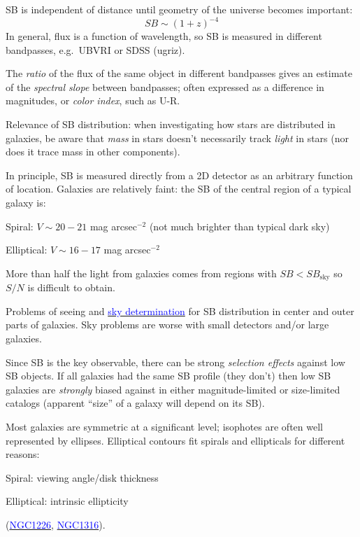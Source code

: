 \documentclass[12pt]{article}
\begin{document}
SB is independent of distance until geometry of the universe becomes
important:
$$SB \sim (1+z)^{-4}$$
In general, flux is a function of wavelength, so SB is measured in
different bandpasses, e.g.\ UBVRI or SDSS (ugriz).

The \emph{ratio} of the flux of the same object in different bandpasses
gives an estimate of the \emph{spectral slope} between bandpasses;
often expressed as a difference in magnitudes, or
\emph{color index}, such as U-R.

Relevance of SB distribution: when investigating how stars are distributed in
galaxies, be aware that \emph{mass} in stars doesn't necessarily track
\emph{light} in stars (nor does it trace mass in other components).

In principle, SB is measured directly from a 2D detector as an
arbitrary function of location.
Galaxies are relatively faint: the SB of the central region of a typical
galaxy is:
\begin{itemize*}
    \item Spiral: $V \sim 20 - 21$ mag arcsec$^{-2}$
        (not much brighter than typical dark sky)
    \item Elliptical: $V \sim 16 - 17$ mag arcsec$^{-2}$
\end{itemize*}
More than half the light from galaxies comes from regions with
$SB < SB_{\textrm{sky}}$ so $S/N$ is difficult to obtain.

Problems of seeing and \href{http://astronomy.nmsu.edu/holtz/a555/html/diagrams/a616/sky.htm}
{\textcolor{blue}{sky determination}} for SB distribution in center and
outer parts of galaxies. Sky problems are worse with small detectors and/or
large galaxies.

Since SB is the key observable, there can be strong \emph{selection effects}
against low SB objects. If all galaxies had the same SB profile (they don't)
then low SB galaxies are \emph{strongly} biased against in either
magnitude-limited or size-limited catalogs (apparent ``size'' of a galaxy will
depend on its SB).

Most galaxies are symmetric at a significant level;
isophotes are often well represented by ellipses.
Elliptical contours fit spirals and ellipticals for different reasons:
\begin{itemize*}
    \item Spiral: viewing angle/disk thickness
    \item Elliptical: intrinsic ellipticity
\end{itemize*}
(\href{http://astronomy.nmsu.edu/holtz/a555/resources/n1226.h.jpg}
{\textcolor{blue}{NGC1226}},
\href{http://astronomy.nmsu.edu/holtz/a555/resources/n1316.h.jpg}
{\textcolor{blue}{NGC1316}}).
\end{document}
